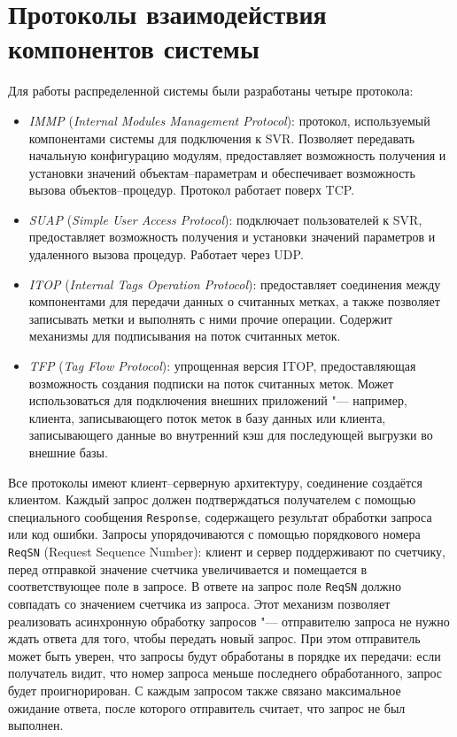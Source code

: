 \section{Протоколы взаимодействия компонентов системы}\label{sec:ch5_protocols}

Для работы распределенной системы были разработаны четыре протокола:

\begin{itemize}
\item{\textit{IMMP} (\textit{Internal Modules Management Protocol}): протокол, используемый компонентами системы для подключения к SVR. Позволяет передавать начальную конфигурацию модулям, предоставляет возможность получения и установки значений объектам--параметрам и обеспечивает возможность вызова объектов--процедур. Протокол работает поверх TCP.}
\item{\textit{SUAP} (\textit{Simple User Access Protocol}): подключает пользователей к SVR, предоставляет возможность получения и установки значений параметров и удаленного вызова процедур. Работает через UDP.}
\item{\textit{ITOP} (\textit{Internal Tags Operation Protocol}): предоставляет соединения между компонентами для передачи данных о считанных метках, а также позволяет записывать метки и выполнять с ними прочие операции. Содержит механизмы для подписывания на поток считанных меток.}
\item{\textit{TFP} (\textit{Tag Flow Protocol}): упрощенная версия ITOP, предоставляющая возможность создания подписки на поток считанных меток. Может использоваться для подключения внешних приложений "--- например, клиента, записывающего поток меток в базу данных или клиента, записывающего данные во внутренний кэш для последующей выгрузки во внешние базы.}
\end{itemize}

Все протоколы имеют клиент--серверную архитектуру, соединение создаётся клиентом. Каждый запрос должен подтверждаться получателем с помощью специального сообщения \texttt{Response}, содержащего результат обработки запроса или код ошибки. Запросы упорядочиваются с помощью порядкового номера \texttt{ReqSN} (Request Sequence Number): клиент и сервер поддерживают по счетчику, перед отправкой значение счетчика увеличивается и помещается в соответствующее поле в запросе. В ответе на запрос поле \texttt{ReqSN} должно совпадать со значением счетчика из запроса. Этот механизм позволяет реализовать асинхронную обработку запросов "--- отправителю запроса не нужно ждать ответа для того, чтобы передать новый запрос. При этом отправитель может быть уверен, что запросы будут обработаны в порядке их передачи: если получатель видит, что номер запроса меньше последнего обработанного, запрос будет проигнорирован. С каждым запросом также связано максимальное ожидание ответа, после которого отправитель считает, что запрос не был выполнен.

